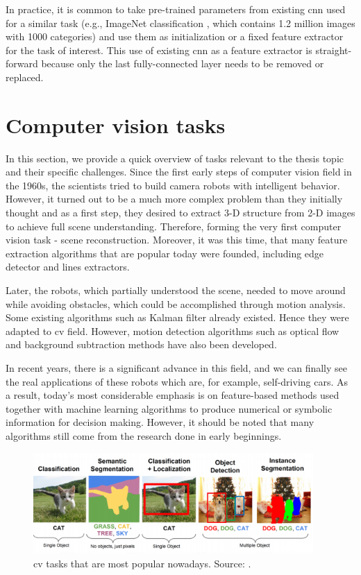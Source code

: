         In practice, it is common to take pre-trained parameters from existing \gls{cnn} used for a similar task (e.g., ImageNet classification \cite{russakovsky2015imagenet}, which contains 1.2 million images with 1000 categories) and use them as initialization or a fixed feature extractor for the task of interest. This use of existing \gls{cnn} as a feature extractor is straight-forward because only the last fully-connected layer needs to be removed or replaced.
        
\section{Computer vision tasks}
    In this section, we provide a quick overview of tasks relevant to the thesis topic and their specific challenges. Since the first early steps of computer vision field in the 1960s, the scientists tried to build camera robots with intelligent behavior. However, it turned out to be a much more complex problem than they initially thought and as a first step, they desired to extract 3-D structure from 2-D images to achieve full scene understanding. Therefore, forming the very first computer vision task - scene reconstruction. Moreover, it was this time, that many feature extraction algorithms that are popular today were founded, including edge detector and lines extractors. 
    
    Later, the robots, which partially understood the scene, needed to move around while avoiding obstacles, which could be accomplished through motion analysis. Some existing algorithms such as Kalman filter already existed. Hence they were adapted to \gls{cv} field. However, motion detection algorithms such as optical flow and background subtraction methods have also been developed.
    
    In recent years, there is a significant advance in this field, and we can finally see the real applications of these robots which are, for example, self-driving cars. As a result, today's most considerable emphasis is on feature-based methods used together with machine learning algorithms to produce numerical or symbolic information for decision making. However, it should be noted that many algorithms still come from the research done in early beginnings. 
    
    \begin{figure}[ht]
        \centering
        \includegraphics[width=0.95\textwidth]{resources/computer-vision-tasks.png}
        \caption{\Gls{cv} tasks that are most popular nowadays. Source: \cite{cs231n}.}
        \label{fig:computer-vision-tasks}
    \end{figure}
    

